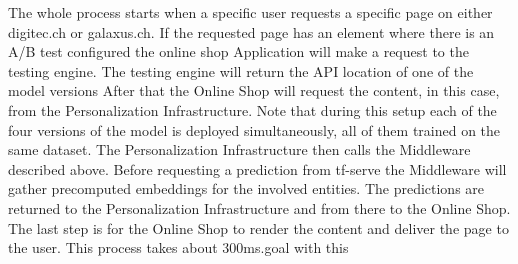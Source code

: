 The whole process starts when a specific user requests a specific page on either digitec.ch or galaxus.ch.
If the requested page has an element where there is an A/B test configured the online shop Application will make a request to the testing engine.
The testing engine will return the API location of one of the model versions
After that the Online Shop will request the content, in this case, from the Personalization Infrastructure.
Note that during this setup each of the four versions of the model is deployed simultaneously, all of them trained on the same dataset.
The Personalization Infrastructure then calls the Middleware described above.
Before requesting a prediction from tf-serve the Middleware will gather precomputed embeddings for the involved entities.
The predictions are returned to the Personalization Infrastructure and from there to the Online Shop.
The last step is for the Online Shop to render the content and deliver the page to the user.
This process takes about 300ms.goal with this